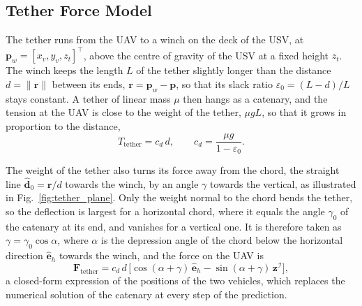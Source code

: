 \subsection{Tether Force Model}

The tether runs from the UAV to a winch on the deck of the USV, at $\mathbf{p}_w = [x_v, y_v, z_t]^\top$, above the centre of gravity of the USV at a fixed height $z_t$. The winch keeps the length $L$ of the tether slightly longer than the distance $d = \|\mathbf{r}\|$ between its ends, $\mathbf{r} = \mathbf{p}_w - \mathbf{p}$, so that its slack ratio $\varepsilon_0 = (L-d)/L$ stays constant. A tether of linear mass $\mu$ then hangs as a catenary, and the tension at the UAV is close to the weight of the tether, $\mu g L$, so that it grows in proportion to the distance,
\begin{equation}
    T_{\mathrm{tether}} = c_d\,d, \qquad c_d = \frac{\mu g}{1-\varepsilon_0}.
    \label{eq:tether_tension}
\end{equation}

The weight of the tether also turns its force away from the chord, the straight line $\hat{\mathbf{d}}_0 = \mathbf{r}/d$ towards the winch, by an angle $\gamma$ towards the vertical, as illustrated in Fig.~\ref{fig:tether_plane}. Only the weight normal to the chord bends the tether, so the deflection is largest for a horizontal chord, where it equals the angle $\gamma_0$ of the catenary at its end, and vanishes for a vertical one. It is therefore taken as $\gamma = \gamma_0\cos\alpha$, where $\alpha$ is the depression angle of the chord below the horizontal direction $\hat{\mathbf{e}}_h$ towards the winch, and the force on the UAV is
\begin{equation}
    \mathbf{F}_{\mathrm{tether}} = c_d\,d\,\big[\cos(\alpha+\gamma)\,\hat{\mathbf{e}}_h - \sin(\alpha+\gamma)\,\mathbf{z}^{\mathcal{I}}\big],
    \label{eq:tether_force}
\end{equation}
a closed-form expression of the positions of the two vehicles, which replaces the numerical solution of the catenary at every step of the prediction.

